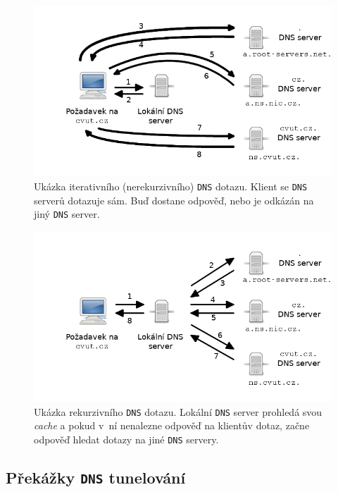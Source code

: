 \documentclass[thesis=M,czech]{FITthesis}[2012/10/20]
\begin{document}
    \clearpage
    
    

  \begin{figure}
  \centering
    \includegraphics[width=\textwidth]{attachments/dns_iterative.png}
    \caption{Ukázka iterativního (nerekurzivního) \texttt{DNS} dotazu. Klient se \texttt{DNS} serverů dotazuje sám. Buď dostane odpověď, nebo je odkázán na jiný \texttt{DNS} server.}
    \label{pic:dns-iterative}
  \end{figure}
    
  \begin{figure}
  \centering
    \includegraphics[width=\textwidth]{attachments/dns_recursive.png}
    \caption{Ukázka rekurzivního \texttt{DNS} dotazu. Lokální \texttt{DNS} server prohledá svou \textit{cache} a pokud v~ní nenalezne odpověď na klientův dotaz, začne odpověď hledat dotazy na jiné \texttt{DNS} servery.}
    \label{pic:dns-recursive}
  \end{figure}


\vfil
\clearpage

    \subsection{Překážky \texttt{DNS} tunelování}
\end{document}
